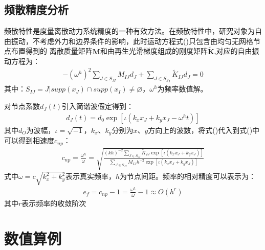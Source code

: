 \subsection{频散精度分析}
频散特性是度量离散动力系统精度的一种有效方法。在频散特性中，研究对象为自由振动，不考虑外力和边界条件的影响，此时运动方程式()只包含由均匀无网格节点布置得到的
离散质量矩阵$\pmb{M}$和由再生光滑梯度组成的刚度矩阵$\tilde{\pmb{K}}$,对应的自由振动方程为：
\begin{equation}
\begin{split}
    - {({\omega ^h})^2}\sum\limits_{J \in {S_{JI}}}^{} {{M_{IJ}}{d_J} + \sum\limits_{J \in {S_J}_I}^{} {{{\tilde K}_{IJ}}{d_J} = 0} } 
\end{split}
\end{equation}
其中：$S_{IJ}={J\vert supp(x_J)\cap supp(x_I)\ne \varnothing}$，$\omega^h$为频率数值解。\par
对节点系数$d_J(t)$引入简谐波假定得到：
\begin{equation}
\begin{split}
    {d_J}(t)={d_0}\exp[\iota({k_x}{x_J}+{k_y}{x_J}-{\omega ^h}t)]
\end{split}
\end{equation}
其中$d_O$为波幅，$\iota=\sqrt{-1}$，$k_x$、$k_y$分别为$x$、$y$方向上的波数，将式()代入到式()中可以得到相速度$c_{np}$：
\begin{equation}
\begin{split}
    {c_{np}} = \frac{{{\omega ^h}}}{\omega } = \sqrt {\frac{{{{(kh)}^{ - 2}}\sum\limits_{J \in {S_{JI}}}^{} {{{\tilde K}_{IJ}}\exp [\iota ({k_x}{x_J} + {k_y}{x_J})]} }}{{\sum\limits_{J \in {S_{JI}}}^{} {{M_{IJ}}{h^{ - 2}}\exp [\iota ({k_x}{x_J} + {k_y}{x_J})]} }}} 
\end{split}
\end{equation}
式中$\omega=c\sqrt{k_x^2+k_y^2}$表示真实频率，$h$为节点间距。频率的相对精度可以表示为：
\begin{equation}
\begin{split}
    {e_f} = {c_{np}} - 1 = \frac{{{\omega ^h}}}{\omega } - 1 \approx O({h^r})
\end{split}
\end{equation}
其中$r$表示频率的收敛阶次



\section{数值算例}

